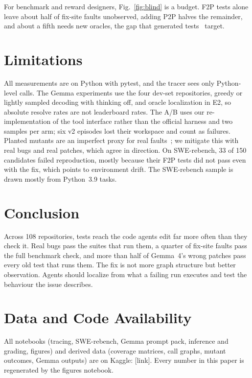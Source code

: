 \documentclass[conference]{IEEEtran}
\begin{document}
For benchmark and reward designers, Fig.~\ref{fig:blind} is a budget. F2P tests alone leave about half of fix-site faults unobserved, adding P2P halves the remainder, and about a fifth needs new oracles, the gap that generated tests~\cite{yu2026sweabs,li2026probe} target.

\section{Limitations}
All measurements are on Python with pytest, and the tracer sees only Python-level calls. The Gemma experiments use the four dev-set repositories, greedy or lightly sampled decoding with thinking off, and oracle localization in E2, so absolute resolve rates are not leaderboard rates. The A/B uses our re-implementation of the tool interface rather than the official harness and two samples per arm; six v2 episodes lost their workspace and count as failures. Planted mutants are an imperfect proxy for real faults~\cite{just2014mutants}; we mitigate this with real bugs and real patches, which agree in direction. On SWE-rebench, 33 of 150 candidates failed reproduction, mostly because their F2P tests did not pass even with the fix, which points to environment drift. The SWE-rebench sample is drawn mostly from Python~3.9 tasks.

\section{Conclusion}
Across 108 repositories, tests reach the code agents edit far more often than they check it. Real bugs pass the suites that run them, a quarter of fix-site faults pass the full benchmark check, and more than half of Gemma~4's wrong patches pass every old test that runs them. The fix is not more graph structure but better observation. Agents should localize from what a failing run executes and test the behaviour the issue describes.

\section*{Data and Code Availability}
All notebooks (tracing, SWE-rebench, Gemma prompt pack, inference and grading, figures) and derived data (coverage matrices, call graphs, mutant outcomes, Gemma outputs) are on Kaggle: [link]. Every number in this paper is regenerated by the figures notebook.
\end{document}
